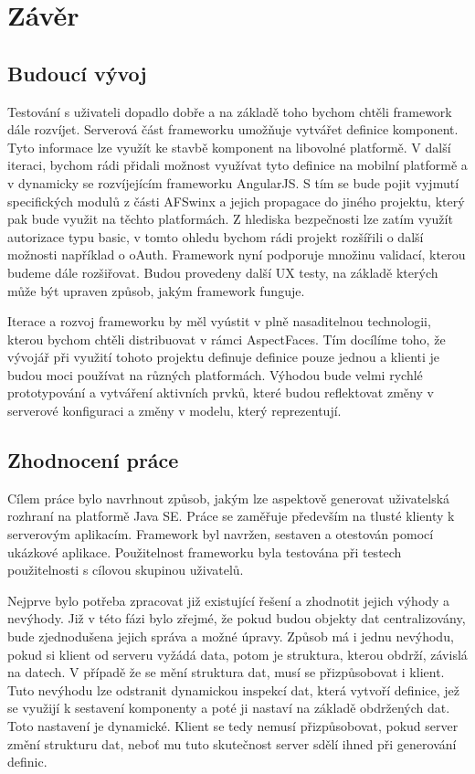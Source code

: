 \chapter{Závěr}
\section{Budoucí vývoj}
Testování s uživateli dopadlo dobře a na základě toho bychom chtěli framework dále rozvíjet. Serverová část frameworku umožňuje vytvářet definice komponent. Tyto informace lze využít ke stavbě komponent na libovolné platformě. V další iteraci, bychom rádi přidali možnost využívat tyto definice na mobilní platformě a v dynamicky se rozvíjejícím frameworku AngularJS. S tím se bude pojit vyjmutí specifických modulů z části AFSwinx a jejich propagace do jiného projektu, který pak bude využit na těchto platformách. Z hlediska bezpečnosti lze zatím využít autorizace typu basic, v tomto ohledu bychom rádi projekt rozšířili o další možnosti například o oAuth. Framework nyní podporuje množinu validací, kterou budeme dále rozšiřovat. Budou provedeny další UX testy, na základě kterých může být upraven způsob, jakým framework funguje.

Iterace a rozvoj frameworku by měl vyústit v plně nasaditelnou technologii, kterou bychom chtěli distribuovat v rámci AspectFaces. Tím docílíme toho, že vývojář při využití tohoto projektu definuje definice pouze jednou a klienti je budou moci používat na různých platformách. Výhodou bude velmi rychlé prototypování a vytváření aktivních prvků, které budou reflektovat změny v serverové konfiguraci a změny v modelu, který reprezentují.
\section{Zhodnocení práce}
Cílem práce bylo navrhnout způsob, jakým lze aspektově generovat uživatelská rozhraní na platformě Java SE. Práce se zaměřuje především na tlusté klienty k serverovým aplikacím. Framework byl navržen, sestaven a otestován pomocí ukázkové aplikace. Použitelnost frameworku byla testována při testech použitelnosti s cílovou skupinou uživatelů.

Nejprve bylo potřeba zpracovat již existující řešení a zhodnotit jejich výhody a nevýhody. Již v této fázi bylo zřejmé, že pokud budou objekty dat centralizovány, bude zjednodušena jejich správa a možné úpravy. Způsob má i jednu nevýhodu, pokud si klient od serveru vyžádá data, potom je struktura, kterou obdrží, závislá na datech. V případě že se mění struktura dat, musí se přizpůsobovat i klient. Tuto nevýhodu lze odstranit dynamickou inspekcí dat, která vytvoří definice, jež se využijí k sestavení komponenty a poté ji nastaví na základě obdržených dat. Toto nastavení je dynamické. Klient se tedy nemusí přizpůsobovat, pokud server změní strukturu dat, neboť mu tuto skutečnost server sdělí ihned při generování definic.


